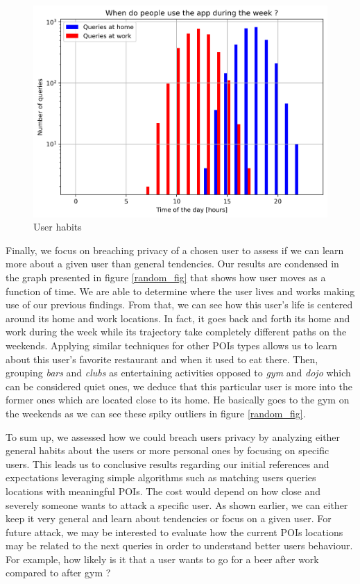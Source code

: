 \documentclass[10pt,conference,compsocconf]{IEEEtran}
\begin{document}
\begin{figure}
  \includegraphics[width=\columnwidth]{when.png}
  \caption{User habits}
  \label{when_fig}
\end{figure}

Finally, we focus on breaching privacy of a chosen user to assess if we can learn more about a given user than general tendencies. Our results are condensed in the graph presented in figure \ref{random_fig} that shows how user moves as a function of time. We are able to determine where the user lives and works making use of our previous findings. From that, we can see how this user's life is centered around its home and work locations. In fact, it goes back and forth its home and work during the week while its trajectory take completely different paths on the weekends. Applying similar techniques for other POIs types allows us to learn about this user's favorite restaurant and when it used to eat there. Then, grouping \textit{bars} and \textit{clubs} as entertaining activities opposed to \textit{gym} and \textit{dojo} which can be considered quiet ones, we deduce that this particular user is more into the former ones which are located close to its home. He basically goes to the gym on the weekends as we can see these spiky outliers in figure \ref{random_fig}.

To sum up, we assessed how we could breach users privacy by analyzing either general habits about the users or more personal ones by focusing on specific users. This leads us to conclusive results regarding our initial references and expectations leveraging simple algorithms such as matching users queries locations with meaningful POIs. The cost would depend on how close and severely someone wants to attack a specific user. As shown earlier, we can either keep it very general and learn about tendencies or focus on a given user. For future attack, we may be interested to evaluate how the current POIs locations may be related to the next queries in order to understand better users behaviour. For example, how likely is it that a user wants to go for a beer after work compared to after gym ?
\end{document}
